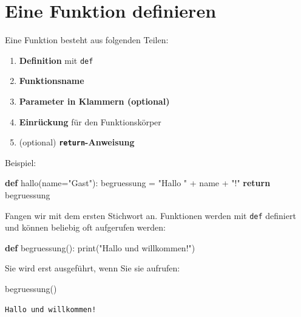\documentclass[
  letterpaper,
  DIV=11,
  numbers=noendperiod]{scrreprt}
\newenvironment{Shaded}{\begin{snugshade}}{\end{snugshade}}
\newcommand{\BuiltInTok}[1]{\textcolor[rgb]{0.00,0.23,0.31}{#1}}
\newcommand{\ControlFlowTok}[1]{\textcolor[rgb]{0.00,0.23,0.31}{\textbf{#1}}}
\newcommand{\KeywordTok}[1]{\textcolor[rgb]{0.00,0.23,0.31}{\textbf{#1}}}
\newcommand{\NormalTok}[1]{\textcolor[rgb]{0.00,0.23,0.31}{#1}}
\newcommand{\OperatorTok}[1]{\textcolor[rgb]{0.37,0.37,0.37}{#1}}
\newcommand{\StringTok}[1]{\textcolor[rgb]{0.13,0.47,0.30}{#1}}
\providecommand{\tightlist}{%
  \setlength{\itemsep}{0pt}\setlength{\parskip}{0pt}}\usepackage{longtable,booktabs,array}
\begin{document}
\section{Eine Funktion definieren}\label{eine-funktion-definieren}

Eine Funktion besteht aus folgenden Teilen:

\begin{enumerate}
\def\labelenumi{\arabic{enumi}.}
\tightlist
\item
  \textbf{Definition} mit \texttt{def}
\item
  \textbf{Funktionsname}
\item
  \textbf{Parameter in Klammern (optional)}
\item
  \textbf{Einrückung} für den Funktionskörper
\item
  (optional) \textbf{\texttt{return}-Anweisung}
\end{enumerate}

Beispiel:

\begin{Shaded}
\begin{Highlighting}[]
\KeywordTok{def}\NormalTok{ hallo(name}\OperatorTok{=}\StringTok{"Gast"}\NormalTok{):}
\NormalTok{    begruessung }\OperatorTok{=} \StringTok{"Hallo "} \OperatorTok{+}\NormalTok{ name }\OperatorTok{+} \StringTok{"!"}
    \ControlFlowTok{return}\NormalTok{ begruessung}
\end{Highlighting}
\end{Shaded}

Fangen wir mit dem ersten Stichwort an. Funktionen werden mit
\texttt{def} definiert und können beliebig oft aufgerufen werden:

\begin{Shaded}
\begin{Highlighting}[]
\KeywordTok{def}\NormalTok{ begruessung():}
    \BuiltInTok{print}\NormalTok{(}\StringTok{"Hallo und willkommen!"}\NormalTok{)}
\end{Highlighting}
\end{Shaded}

Sie wird erst ausgeführt, wenn Sie sie aufrufen:

\begin{Shaded}
\begin{Highlighting}[]
\NormalTok{begruessung()}
\end{Highlighting}
\end{Shaded}

\begin{verbatim}
Hallo und willkommen!
\end{verbatim}
\end{document}
